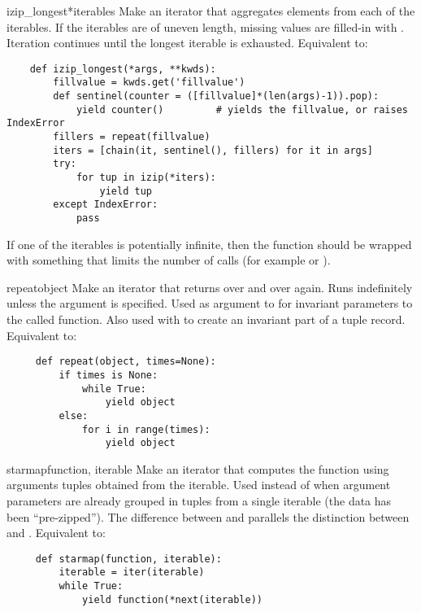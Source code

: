 \begin{funcdesc}{izip_longest}{*iterables}
  Make an iterator that aggregates elements from each of the iterables.
  If the iterables are of uneven length, missing values are filled-in
  with .  Iteration continues until the longest iterable
  is exhausted.  Equivalent to:

  \begin{verbatim}
    def izip_longest(*args, **kwds):
        fillvalue = kwds.get('fillvalue')
        def sentinel(counter = ([fillvalue]*(len(args)-1)).pop):
            yield counter()         # yields the fillvalue, or raises IndexError
        fillers = repeat(fillvalue)
        iters = [chain(it, sentinel(), fillers) for it in args]
        try:
            for tup in izip(*iters):
                yield tup
        except IndexError:
            pass
  \end{verbatim}

  If one of the iterables is potentially infinite, then the
   function should be wrapped with something
  that limits the number of calls (for example  or
  ).
\end{funcdesc}

\begin{funcdesc}{repeat}{object}
  Make an iterator that returns  over and over again.
  Runs indefinitely unless the  argument is specified.
  Used as argument to  for invariant parameters
  to the called function.  Also used with  to create
  an invariant part of a tuple record.  Equivalent to:

  \begin{verbatim}
     def repeat(object, times=None):
         if times is None:
             while True:
                 yield object
         else:
             for i in range(times):
                 yield object
  \end{verbatim}
\end{funcdesc}

\begin{funcdesc}{starmap}{function, iterable}
  Make an iterator that computes the function using arguments tuples
  obtained from the iterable.  Used instead of  when
  argument parameters are already grouped in tuples from a single iterable
  (the data has been ``pre-zipped'').  The difference between
   and  parallels the distinction
  between  and .
  Equivalent to:

  \begin{verbatim}
     def starmap(function, iterable):
         iterable = iter(iterable)
         while True:
             yield function(*next(iterable))
  \end{verbatim}
\end{funcdesc}

